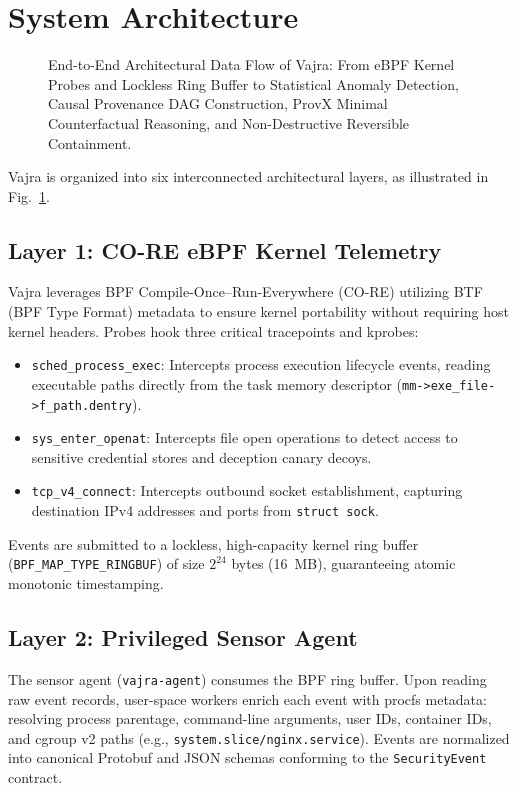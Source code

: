 \documentclass[conference]{IEEEtran}
\begin{document}
\section{System Architecture}
\label{sec:architecture}

\begin{figure}[!t]
\centering

\caption{End-to-End Architectural Data Flow of Vajra: From eBPF Kernel Probes and Lockless Ring Buffer to Statistical Anomaly Detection, Causal Provenance DAG Construction, ProvX Minimal Counterfactual Reasoning, and Non-Destructive Reversible Containment.}
\label{fig:architecture}
\end{figure}

Vajra is organized into six interconnected architectural layers, as illustrated in Fig.~\ref{fig:architecture}.

\subsection{Layer 1: CO-RE eBPF Kernel Telemetry}
Vajra leverages BPF Compile-Once--Run-Everywhere (CO-RE) utilizing BTF (BPF Type Format) metadata to ensure kernel portability without requiring host kernel headers. Probes hook three critical tracepoints and kprobes:
\begin{itemize}
    \item \texttt{sched\_process\_exec}: Intercepts process execution lifecycle events, reading executable paths directly from the task memory descriptor (\texttt{mm->exe\_file->f\_path.dentry}).
    \item \texttt{sys\_enter\_openat}: Intercepts file open operations to detect access to sensitive credential stores and deception canary decoys.
    \item \texttt{tcp\_v4\_connect}: Intercepts outbound socket establishment, capturing destination IPv4 addresses and ports from \texttt{struct sock}.
\end{itemize}
Events are submitted to a lockless, high-capacity kernel ring buffer (\texttt{BPF\_MAP\_TYPE\_RINGBUF}) of size $2^{24}$ bytes (16~MB), guaranteeing atomic monotonic timestamping.

\subsection{Layer 2: Privileged Sensor Agent}
The sensor agent (\texttt{vajra-agent}) consumes the BPF ring buffer. Upon reading raw event records, user-space workers enrich each event with procfs metadata: resolving process parentage, command-line arguments, user IDs, container IDs, and cgroup v2 paths (e.g., \texttt{system.slice/nginx.service}). Events are normalized into canonical Protobuf and JSON schemas conforming to the \texttt{SecurityEvent} contract.
\end{document}
